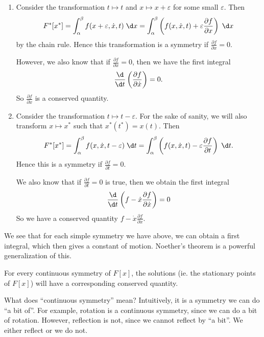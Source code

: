 \documentclass[a4paper]{article}
\begin{document}
\begin{eg}\leavevmode
  \begin{enumerate}
    \item Consider the transformation $t \mapsto t$ and $x \mapsto x + \varepsilon$ for some small $\varepsilon$. Then
      \[
        F^*[x^*] = \int_\alpha^\beta f(x + \varepsilon, \dot{x}, t)\;\d x = \int_\alpha^\beta \left(f(x, \dot{x}, t) + \varepsilon \frac{\partial f}{\partial x}\right)\;\d x
      \]
      by the chain rule. Hence this transformation is a symmetry if $\frac{\partial f}{\partial x} = 0$.

      However, we also know that if $\frac{\partial f}{\partial x} = 0$, then we have the first integral
      \[
        \frac{\d}{\d t}\left(\frac{\partial f}{\partial \dot{x}}\right) = 0.
      \]
      So $\frac{\partial f}{\partial \dot{x}}$ is a conserved quantity.
    \item Consider the transformation $t \mapsto t - \varepsilon$. For the sake of sanity, we will also transform $x\mapsto x^*$ such that $x^*(t^*) = x(t)$. Then
      \[
        F^*[x^*] = \int_\alpha^\beta f(x, \dot{x}, t - \varepsilon)\;\d t = \int_\alpha^\beta \left(f(x, \dot{x}, t) - \varepsilon \frac{\partial f}{\partial t}\right)\;\d t.
      \]
      Hence this is a symmetry if $\frac{\partial f}{\partial t} = 0$.

      We also know that if $\frac{\partial f}{\partial t} = 0$ is true, then we obtain the first integral
      \[
        \frac{\d}{\d t}\left(f - \dot{x}\frac{\partial f}{\partial \dot{x}}\right) = 0
      \]
      So we have a conserved quantity $f - \dot{x}\frac{\partial f}{\partial \dot{x}}$.
  \end{enumerate}
\end{eg}
We see that for each simple symmetry we have above, we can obtain a first integral, which then gives a constant of motion. Noether's theorem is a powerful generalization of this.

\begin{thm}
  For every continuous symmetry of $F[x]$, the solutions (ie. the stationary points of $F[x]$) will have a corresponding conserved quantity.
\end{thm}
What does ``continuous symmetry'' mean? Intuitively, it is a symmetry we can do ``a bit of''. For example, rotation is a continuous symmetry, since we can do a bit of rotation. However, reflection is not, since we cannot reflect by ``a bit''. We either reflect or we do not.
\end{document}
